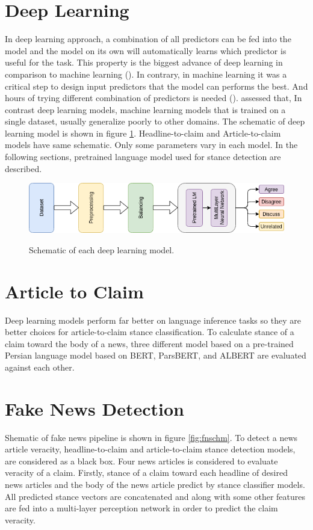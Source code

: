 \section{Deep Learning}
In deep learning approach, a combination of all predictors can be fed into the model and the model on its own will automatically learns which predictor is useful for the task. This property is the biggest advance of deep learning in comparison to machine learning (\cite{book_datafake}). In contrary, in machine learning it was a critical step to design input predictors that the model can performs the best. And hours of trying different combination of predictors is needed (\cite{book_fake}). \cite{stance_robust} assessed that, In contrast deep learning models, machine learning models that is trained on a single dataset, usually generalize poorly to other domains.
The schematic of deep learning model is shown in figure \ref{fig:dlschm}. Headline-to-claim and Article-to-claim models have same schematic. Only some parameters vary in each model. In the following sections, pretrained language model used for stance detection are described. 
\begin{figure}%
	\centering
	{\includegraphics[width=14.5cm]{statistics/schema/dl.png} }
	\caption{Schematic of each deep learning model.}%
	\label{fig:dlschm}%
\end{figure}


\section{Article to Claim}
Deep learning models perform far better on language inference tasks so they are better choices for article-to-claim stance classification. To calculate stance of a claim toward the body of a news, three different model based on a pre-trained Persian language model based on BERT, ParsBERT, and  ALBERT are evaluated against each other. 

\section{Fake News Detection}
	\label{sec:fakenews}
Shematic of fake news pipeline is shown in figure \ref{fig:fnschm}. To detect a news article veracity, headline-to-claim and article-to-claim stance detection models, are considered as a black box. Four news articles is considered to evaluate veracity of a claim. Firstly, stance of a claim toward each headline of desired news articles and the body of the news article predict by stance classifier models. All predicted stance vectors are concatenated and along with some other features are fed into a multi-layer perception network in order to predict the claim veracity.

